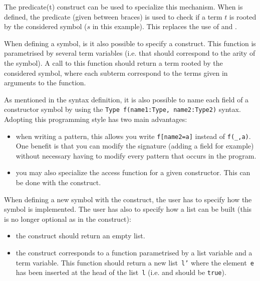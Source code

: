 \label{isfsym} 
The  \lex{\{} predicate(t) \lex{\}} construct can be
used to specialize this mechanism. When  is defined, the
predicate (given between braces) is used to check if a term $t$ is
rooted by the considered symbol ($s$ in this example). This replaces
the use of  and .

\label{make}When defining a symbol, is it also possible to specify a
 construct. This function is parametrised by several 
term variables (i.e. that should correspond to the arity of the
symbol). A call to this  function should return a term
rooted by the considered symbol, where each subterm correspond to the
terms given in arguments to the function.

\noindent
As mentioned in the syntax definition, it is also possible to name
each field of a constructor symbol by using the
\texttt{Type f(name1:Type, name2:Type2)} syntax.  
Adopting this programming style has two main advantages:
\begin{itemize}
\item when writing a pattern, this allows you write \texttt{f[name2=a]}
  instead of \texttt{f(\_,a)}. One benefit is that you can modify the
  signature (adding a field for example) without necessary having to
  modify every pattern that occurs in the program.

\item\label{getslot} you may also specialize the  access
function for a given constructor. This can be done with the
 construct.
\end{itemize}


\smallskip\noindent\label{oplistdef}
When defining a new symbol with the  construct,
the user has to specify how the symbol is implemented. 
The user has also to specify how a list can be built (this is no
longer optional as in the  construct):
\begin{itemize}
\item\label{emptylist} the  construct should return an empty
  list.

\item\label{insert} the  construct corresponds to a function
  parametrised by a list variable and a term variable. This function
  should return a new list~\texttt{l'} where the element~\texttt{e}
  has been inserted at the head of the list~\texttt{l}
  (i.e.  and
   should be \texttt{true}).
\end{itemize}

